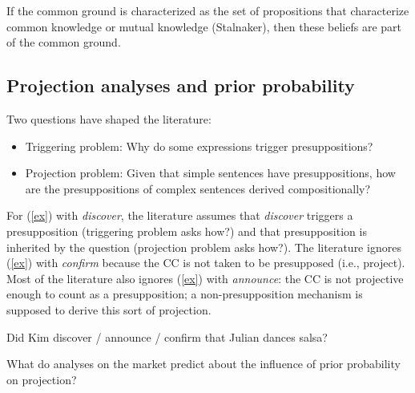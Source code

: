 \documentclass[11pt,fleqn]{article}
\newcommand{\6}{\mbox{$[\hspace*{-.6mm}[$}}
\newcommand{\9}{\mbox{$]\hspace*{-.6mm}]$}}
\begin{document}
If the common ground is characterized as the set of propositions that characterize common knowledge or mutual knowledge (Stalnaker), then these beliefs are part of the common ground.

\subsection{Projection analyses and prior probability}

Two questions have shaped the literature:

\begin{itemize}

\item Triggering problem: Why do some expressions trigger presuppositions?

\item Projection problem: Given that simple sentences have presuppositions, how are the presuppositions of complex sentences derived compositionally?

\end{itemize}

For (\ref{ex}) with {\em discover}, the literature assumes that {\em discover} triggers a presupposition (triggering problem asks how?) and that presupposition is inherited by the question (projection problem asks how?). The literature ignores (\ref{ex}) with {\em confirm} because the CC is not taken to be presupposed (i.e., project). Most of the literature also ignores (\ref{ex}) with {\em announce}: the CC is not projective enough to count as a presupposition; a non-presupposition mechanism is supposed to derive this sort of projection.

\begin{exe}
\ex\label{ex} Did Kim discover / announce / confirm that Julian dances salsa?
\end{exe}

What do analyses on the market predict about the influence of prior probability on projection?

\subsubsection{\citealt{heim83}}
\end{document}
